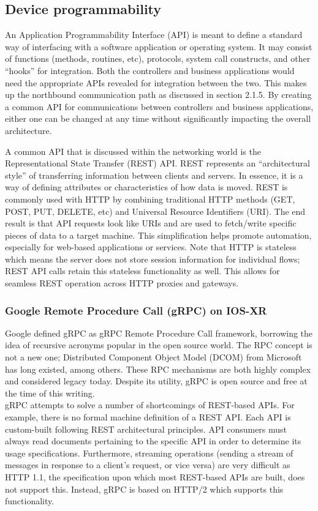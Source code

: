 \subsection{Device programmability}
An Application Programmability Interface (API) is meant to define a standard
way of interfacing with a software application or operating system. It may
consist of functions (methods, routines, etc), protocols, system call
constructs, and other ``hooks'' for integration. Both the controllers and
business applications would need the appropriate APIs revealed for integration
between the two. This makes up the northbound communication path as discussed
in section 2.1.5. By creating a common API for communications between
controllers and business applications, either one can be changed at any time
without significantly impacting the overall architecture.

A common API that is discussed within the networking world is the
Representational State Transfer (REST) API\@. REST represents an ``architectural
style'' of transferring information between clients and servers. In essence, it
is a way of defining attributes or characteristics of how data is moved. REST
is commonly used with HTTP by combining traditional HTTP methods (GET, POST,
PUT, DELETE, etc) and Universal Resource Identifiers (URI). The end result is
that API requests look like URIs and are used to fetch/write specific pieces
of data to a target machine. This simplification helps promote automation,
especially for web-based applications or services. Note that HTTP is stateless
which means the server does not store session information for individual
flows; REST API calls retain this stateless functionality as well. This allows
for seamless REST operation across HTTP proxies and gateways.

\subsubsection{Google Remote Procedure Call (gRPC) on IOS-XR}
Google defined gRPC as gRPC Remote Procedure Call framework, borrowing the
idea of recursive acronyms popular in the open source world. The RPC concept
is not a new one; Distributed Component Object Model (DCOM) from Microsoft has
long existed, among others. These RPC mechanisms are both highly complex and
considered legacy today. Despite its utility, gRPC is open source and free at
the time of this writing. \\

gRPC attempts to solve a number of shortcomings of REST-based APIs. For
example, there is no formal machine definition of a REST API\@. Each API is
custom-built following REST architectural principles. API consumers must
always read documents pertaining to the specific API in order to determine its
usage specifications. Furthermore, streaming operations (sending a stream of
messages in response to a client's request, or vice versa) are very difficult
as HTTP 1.1, the specification upon which most REST-based APIs are built, does
not support this. Instead, gRPC is based on HTTP/2 which supports this
functionality. \\

